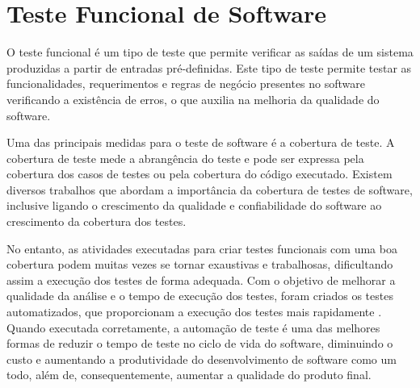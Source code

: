 \documentclass[12pt]{article}
\begin{document}
	
\section{Teste Funcional de Software}
O teste funcional é um tipo de teste que permite verificar as saídas de um sistema produzidas a partir de entradas pré-definidas. Este tipo de teste permite testar as funcionalidades, requerimentos e regras de negócio presentes no software\cite{molinari2003testes} verificando a existência de erros, o que auxilia na melhoria da qualidade do software.

Uma das principais medidas para o teste de software é a cobertura de teste. A cobertura de teste mede a abrangência do teste e pode ser expressa pela cobertura dos casos de testes ou pela cobertura do código executado. Existem diversos trabalhos que abordam a importância da cobertura de testes de software\cite{zhu1997software,bieman1996using}, inclusive ligando o crescimento da qualidade e confiabilidade do software ao crescimento da cobertura dos testes\cite{malaiya2002software}.


No entanto, as atividades executadas para criar testes funcionais com uma boa cobertura podem muitas vezes se tornar exaustivas e trabalhosas, dificultando assim a execução dos testes de forma adequada. Com o objetivo de melhorar a qualidade da análise e o tempo de execução dos testes, foram criados os testes automatizados, que proporcionam a execução dos testes mais rapidamente \cite{fantinato2005autotest}. Quando executada corretamente, a automação de teste é uma das melhores formas de reduzir o tempo de teste no ciclo de vida do software, diminuindo o custo e aumentando a produtividade do desenvolvimento de software como um todo, além de, consequentemente, aumentar a qualidade do produto final.
\end{document}
